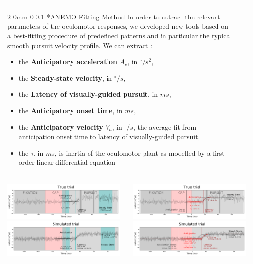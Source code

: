 \documentclass[profile,final,english, draft]{sciposter}%
\makeatletter
\renewcommand{\subsection}{\@startsection
        {subsection}%
        {2}%
        {0mm}%
        {0\baselineskip}%
        {0.1\baselineskip}%
        {\Large\color[rgb]{0.4,0,0}\bfseries}}%
\newcommand{\spacefig}{1.\baselineskip}
\makeatother
\begin{document}
\begin{tabular}{p{}m{}p{}}
\subsection*{ANEMO Fitting Method}
In order to extract the relevant parameters of the oculomotor responses, we developed new tools based on a best-fitting procedure of predefined patterns and in particular the typical smooth pursuit velocity profile. We can extract :
\begin{itemize}\setlength{\itemsep}{0ex}
\item the \textbf{Anticipatory acceleration} $A_a$, in $^\circ/s^2$,
\item the \textbf{Steady-state velocity}, in $^\circ/s$,
\item the \textbf{Latency of visually-guided pursuit}, in $ms$,
\item the \textbf{Anticipatory onset time},  in $ms$,
\item the \textbf{Anticipatory velocity} $V_a$, in $^\circ/s$, the average fit from anticipation onset time to latency of visually-guided pursuit,
\item the \textbf{{\Large $\tau$}}, in $ms$, is inertia of the oculomotor plant as modelled by a first-order linear differential equation %
\end{itemize}
\end{tabular}

\vspace{-1\baselineskip}
\begin{tabular}{m{}m{}m{}} 
\includegraphics[width=0.455\columnwidth]{Old_methods_reel} %
\vspace{\spacefig}
\includegraphics[width=0.455\columnwidth]{Old_methods_simulation}
 &&
\includegraphics[width=0.455\columnwidth]{Fit_reel}
\vspace{\spacefig}
\includegraphics[width=0.455\columnwidth]{Fit_simulation}
\end{tabular}
\end{document}
